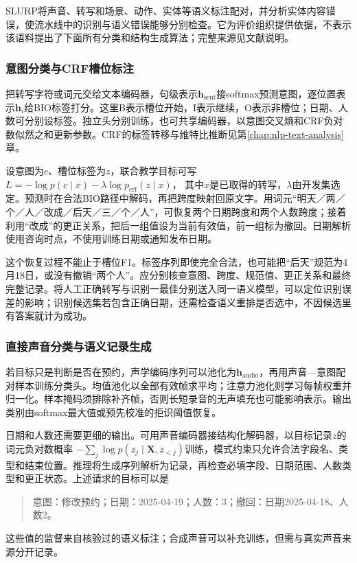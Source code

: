 SLURP将声音、转写和场景、动作、实体等语义标注配对，并分析实体内容错误，使流水线中的识别与语义错误能够分别检查。它为评价组织提供依据，不表示该语料提出了下面所有分类和结构生成算法；完整来源见文献说明。

\subsubsection{意图分类与CRF槽位标注}
\label{sec:nlp-speech-intent-crf}

把转写字符或词元交给文本编码器，句级表示$\bm{h}_{\mathrm{sent}}$接softmax预测意图，逐位置表示$\bm{h}_i$给BIO标签打分。这里B表示槽位开始，I表示继续，O表示非槽位；日期、人数可分别设标签。独立头分别训练，也可共享编码器，以意图交叉熵和CRF负对数似然之和更新参数。CRF的标签转移与维特比推断见第\ref{chap:nlp-text-analysis}章。

设意图为$c$、槽位标签为$z$，联合教学目标可写
$L=-\log p(c\mid x)-\lambda\log p_{\mathrm{crf}}(z\mid x)$，
其中$x$是已取得的转写，$\lambda$由开发集选定。预测时在合法BIO路径中解码，再把跨度映射回原文字。用词元“明天／两／个／人／改成／后天／三／个／人”，可恢复两个日期跨度和两个人数跨度；接着利用“改成”的更正关系，把后一组值设为当前有效值，前一组标为撤回。日期解析使用咨询时点，不使用训练日期或通知发布日期。

这个恢复过程不能止于槽位F1。标签序列即使完全合法，也可能把“后天”规范为4月18日，或没有撤销“两个人”。应分别核查意图、跨度、规范值、更正关系和最终完整记录。将人工正确转写与识别一最佳分别送入同一语义模型，可以定位识别误差的影响；识别候选集若包含正确日期，还需检查语义重排是否选中，不因候选里有答案就计为成功。

\subsubsection{直接声音分类与语义记录生成}
\label{sec:nlp-speech-direct-slu}

若目标只是判断是否在预约，声学编码序列可以池化为$\bm{h}_{\mathrm{audio}}$，再用声音—意图配对样本训练分类头。均值池化以全部有效帧求平均；注意力池化则学习每帧权重并归一化。样本掩码须排除补齐帧，否则长短录音的无声填充也可能影响表示。输出类别由softmax最大值或预先校准的拒识阈值恢复。

日期和人数还需要更细的输出。可用声音编码器接结构化解码器，以目标记录$z$的词元负对数概率
$-\sum_j\log p(z_j\mid\bm{X},z_{<j})$训练，模式约束只允许合法字段名、类型和结束位置。推理将生成序列解析为记录，再检查必填字段、日期范围、人数类型和更正状态。上述请求的目标可以是
\begin{quote}
意图：修改预约；日期：2025-04-19；人数：3；撤回：日期2025-04-18、人数2。
\end{quote}
这些值的监督来自核验过的语义标注；合成声音可以补充训练，但需与真实声音来源分开记录。

